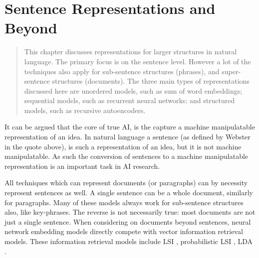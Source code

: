 \documentclass[12pt,parskip]{komatufte}
\begin{document}
\chapter{Sentence Representations and Beyond}\label{sec:sentence-representations-and-beyond}
\begin{abstract}
	This chapter discusses representations for larger structures in natural language.
	The primary focus is on the sentence level.
	However a lot of the techniques also apply for sub-sentence structures (phrases), and super-sentence structures (documents).
	The three main types of representations discussed here are unordered models, such as sum of word embeddings; sequential models, such as recurrent neural networks; and structured models, such as recursive autoencoders.
\end{abstract}




It can be argued that the core of true AI,
is the capture a machine manipulatable representation of an idea.
In natural language a sentence (as defined by Webster in the quote above),
is such a representation of an idea, but it is not machine manipulatable.
As such the conversion of sentences to a machine manipulatable representation is an important task in AI research.


All techniques which can represent documents (or paragraphs) can by necessity represent sentences as well.
A single sentence can be a whole document, similarly for paragraphs.
Many of these models always work for sub-sentence structures also, like key-phrases.
The reverse is not necessarily true: most documents are not just a single sentence.
When considering on documents beyond sentences,
neural network embedding models directly compete with vector information retrieval models.
These information retrieval models include LSI , probabilistic LSI ,  LDA .
\end{document}
